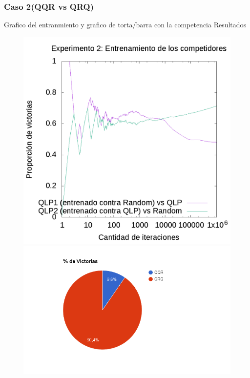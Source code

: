 \documentclass[10pt, a4paper]{article}
\begin{document}
\subsubsection{Caso 2(QQR vs QRQ)}

Grafico del entranmiento y grafico de torta/barra con la competencia Resultados

\begin{figure}[H]
  \begin{minipage}[c]{1\textwidth}
  \includegraphics[scale=0.2]{E2train.png}
  \includegraphics[scale=0.3]{QQRvsQRQ.png}
  \end{minipage}
\end{figure}
\end{document}
